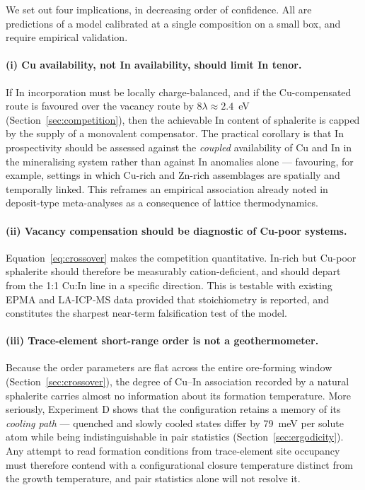 \documentclass[11pt,a4paper]{article}
\begin{document}
We set out four implications, in decreasing order of confidence. All are
predictions of a model calibrated at a single composition on a small box, and
require empirical validation.

\paragraph{(i) Cu availability, not In availability, should limit In tenor.}
If In incorporation must be locally charge-balanced, and if the Cu-compensated
route is favoured over the vacancy route by $8\lambda \approx 2.4$~eV
(Section~\ref{sec:competition}), then the achievable In content of sphalerite is
capped by the supply of a monovalent compensator. The practical corollary is
that In prospectivity should be assessed against the \emph{coupled} availability
of Cu and In in the mineralising system rather than against In anomalies alone
--- favouring, for example, settings in which Cu-rich and Zn-rich assemblages are
spatially and temporally linked. This reframes an empirical association already
noted in deposit-type meta-analyses as a consequence of lattice thermodynamics.

\paragraph{(ii) Vacancy compensation should be diagnostic of Cu-poor systems.}
Equation~\eqref{eq:crossover} makes the competition quantitative. In-rich but
Cu-poor sphalerite should therefore be measurably cation-deficient, and should
depart from the 1:1 Cu:In line in a specific direction. This is testable with
existing EPMA and LA-ICP-MS data provided that stoichiometry is reported, and
constitutes the sharpest near-term falsification test of the model.

\paragraph{(iii) Trace-element short-range order is not a geothermometer.}
Because the order parameters are flat across the entire ore-forming window
(Section~\ref{sec:crossover}), the degree of Cu--In association recorded by a
natural sphalerite carries almost no information about its formation
temperature. More seriously, Experiment D shows that the configuration retains a
memory of its \emph{cooling path} --- quenched and slowly cooled states differ by
79~meV per solute atom while being indistinguishable in pair statistics
(Section~\ref{sec:ergodicity}). Any attempt to read formation conditions from
trace-element site occupancy must therefore contend with a configurational
closure temperature distinct from the growth temperature, and pair statistics
alone will not resolve it.
\end{document}
